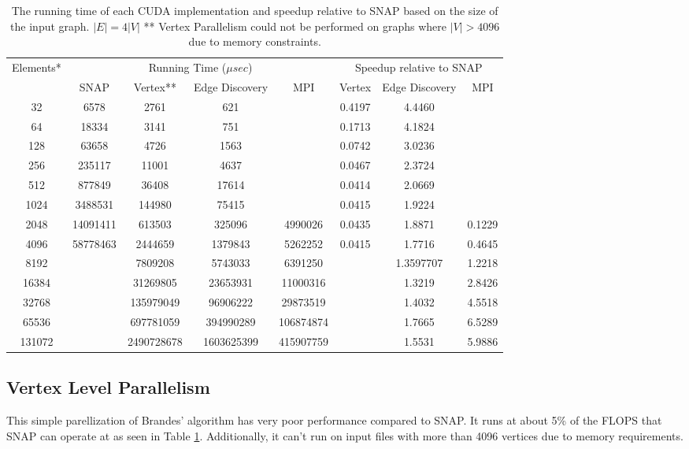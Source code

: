 \documentclass[10pt,twocolumn]{article}
\begin{document}
\begin{table}[h]
\centering
\label{tbl:compare}
\begin{tabular}{|c|c|c|c|c|c|c|c|}
\hline
\multirow{2}{*}{Elements*}& \multicolumn{4}{c|}{Running Time ($\mu sec$)} & \multicolumn{3}{c|}{Speedup relative to SNAP}\\\cline{2-8}
&SNAP&Vertex**&Edge Discovery&MPI&Vertex&Edge Discovery&MPI\\\hline
32 & 6578 & 2761 & 621 &  & 0.4197 & 4.4460 & \\\hline
64 & 18334 & 3141 & 751 &  & 0.1713 & 4.1824 & \\\hline
128 & 63658 & 4726 & 1563 &  & 0.0742 & 3.0236 & \\\hline
256 & 235117 & 11001 & 4637 &  & 0.0467 & 2.3724 & \\\hline
512 & 877849 & 36408 & 17614 &  & 0.0414 & 2.0669 & \\\hline
1024 & 3488531 & 144980 & 75415 &  & 0.0415 & 1.9224 & \\\hline
2048 & 14091411 & 613503 & 325096 & 4990026 & 0.0435 & 1.8871 & 0.1229\\\hline
4096 & 58778463 & 2444659 & 1379843 & 5262252 & 0.0415 & 1.7716 & 0.4645\\\hline
8192 &  & 7809208 & 5743033 & 6391250 &  & 1.3597707 & 1.2218\\\hline
16384 &  & 31269805 & 23653931 & 11000316 &  & 1.3219 & 2.8426\\\hline
32768 &  & 135979049 & 96906222 & 29873519 &  & 1.4032 & 4.5518\\\hline
65536 &  & 697781059 & 394990289 & 106874874 &  & 1.7665 & 6.5289\\\hline
131072 &  & 2490728678 & 1603625399 & 415907759 &  & 1.5531 & 5.9886\\\hline
\end{tabular}
\caption{The running time of each CUDA implementation and speedup relative to SNAP based on the size of the input graph.\newline
{\scriptsize *$|E| = 4|V|$ \newline
** Vertex Parallelism could not be performed on graphs where $|V|>4096$ due to memory constraints.}
}
\end{table}

\subsection{Vertex Level Parallelism}
This simple parellization of Brandes' algorithm has very poor performance compared to SNAP. It runs at about 5\% of the FLOPS that SNAP can operate at as seen in Table \ref{tbl:compare}. Additionally, it can't run on input files with more than 4096 vertices due to memory requirements.
\end{document}
